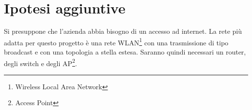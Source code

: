 \section{Ipotesi aggiuntive}
\hspace{24pt} Si presuppone che l'azienda abbia bisogno di un accesso ad internet. La rete più adatta per questo progetto è una rete WLAN\footnote{Wireless Local Area Network} con una trasmissione di tipo broadcast e con una topologia a stella estesa. Saranno quindi necessari un router, degli switch e degli AP\footnote{Access Point}.